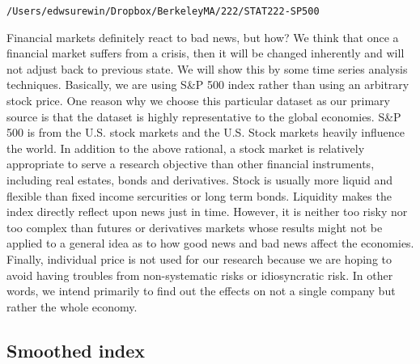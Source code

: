 \documentclass[letterpaper,10pt,english]{/Users/edwsurewin/anaconda/lib/python2.7/site-packages/sphinx/texinputs/sphinxhowto}
\newenvironment{InvisibleVerbatim}
        {\begin{mdframed}[leftmargin=0.1\linewidth,innerleftmargin=3pt,innerrightmargin=3pt, userdefinedwidth=1\linewidth, linewidth=0pt, linecolor=white, usetwoside=false]}
        {\end{mdframed}}
\begin{document}
        

            
                \begin{InvisibleVerbatim}
                \vspace{-0.5\baselineskip}
\begin{alltt}/Users/edwsurewin/Dropbox/Berkeley MA/222/STAT222-SP500
\end{alltt}

            \end{InvisibleVerbatim}
            
        
    
Financial markets definitely react to bad news, but how? We think that
once a financial market suffers from a crisis, then it will be changed
inherently and will not adjust back to previous state. We will show this
by some time series analysis techniques. Basically, we are using S\&P
500 index rather than using an arbitrary stock price. One reason why we
choose this particular dataset as our primary source is that the dataset
is highly representative to the global economies. S\&P 500 is from the
U.S. stock markets and the U.S. Stock markets heavily influence the
world. In addition to the above rational, a stock market is relatively
appropriate to serve a research objective than other financial
instruments, including real estates, bonds and derivatives. Stock is
usually more liquid and flexible than fixed income sercurities or long
term bonds. Liquidity makes the index directly reflect upon news just in
time. However, it is neither too risky nor too complex than futures or
derivatives markets whose results might not be applied to a general idea
as to how good news and bad news affect the economies. Finally,
individual price is not used for our research because we are hoping to
avoid having troubles from non-systematic risks or idiosyncratic risk.
In other words, we intend primarily to find out the effects on not a
single company but rather the whole economy.\subsection{Smoothed index}\label{smoothed-index}

\end{document}
